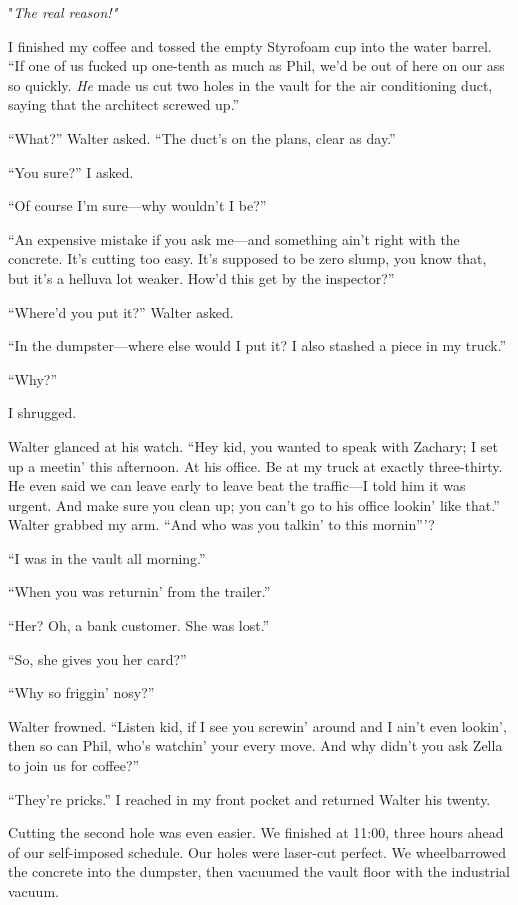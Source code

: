"\emph{The real reason!"}

I finished my coffee and tossed the empty Styrofoam cup into the water
barrel. ``If one of us fucked up one-tenth as much as Phil, we'd be out
of here on our ass so quickly. \emph{He} made us cut two holes in the
vault for the air conditioning duct, saying that the architect screwed
up.''

``What?'' Walter asked. ``The duct's on the plans, clear as day.''

``You sure?'' I asked.

``Of course I'm sure---why wouldn't I be?''

``An expensive mistake if you ask me---and something ain't right with
the concrete. It's cutting too easy. It's supposed to be zero slump, you
know that, but it's a helluva lot weaker. How'd this get by the
inspector?''

``Where'd you put it?'' Walter asked.

``In the dumpster---where else would I put it? I also stashed a piece in
my truck.''

``Why?''

I shrugged.

Walter glanced at his watch. ``Hey kid, you wanted to speak with
Zachary; I set up a meetin' this afternoon. At his office. Be at my
truck at exactly three-thirty. He even said we can leave early to leave
beat the traffic---I told him it was urgent. And make sure you clean up;
you can't go to his office lookin' like that.'' Walter grabbed my arm.
``And who was you talkin' to this mornin'''?

``I was in the vault all morning.''

``When you was returnin' from the trailer.''

``Her? Oh, a bank customer. She was lost.''

``So, she gives you her card?''

``Why so friggin' nosy?''

Walter frowned. ``Listen kid, if I see you screwin' around and I ain't
even lookin', then so can Phil, who's watchin' your every move. And why
didn't you ask Zella to join us for coffee?''

``They're pricks.'' I reached in my front pocket and returned Walter his
twenty.

Cutting the second hole was even easier. We finished at 11:00, three
hours ahead of our self-imposed schedule. Our holes were laser-cut
perfect. We wheelbarrowed the concrete into the dumpster, then vacuumed
the vault floor with the industrial vacuum.

